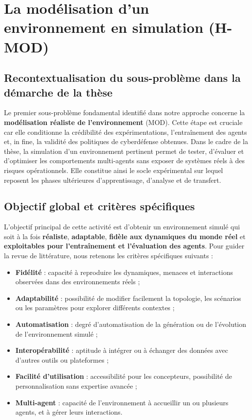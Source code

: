 \section{La modélisation d'un environnement en simulation (H-MOD)}

\subsection*{Recontextualisation du sous-problème dans la démarche de la thèse}

Le premier sous-problème fondamental identifié dans notre approche concerne la \textbf{modélisation réaliste de l’environnement} (MOD). Cette étape est cruciale car elle conditionne la crédibilité des expérimentations, l’entraînement des agents et, in fine, la validité des politiques de cyberdéfense obtenues. Dans le cadre de la thèse, la simulation d’un environnement pertinent permet de tester, d’évaluer et d’optimiser les comportements multi-agents sans exposer de systèmes réels à des risques opérationnels. Elle constitue ainsi le socle expérimental sur lequel reposent les phases ultérieures d’apprentissage, d’analyse et de transfert. \subsection*{Objectif global et critères spécifiques} L’objectif principal de cette activité est d’obtenir un environnement simulé qui soit à la fois \textbf{réaliste}, \textbf{adaptable}, \textbf{fidèle aux dynamiques du monde réel} et \textbf{exploitables pour l’entraînement et l’évaluation des agents}. Pour guider la revue de littérature, nous retenons les critères spécifiques suivants :
%
\begin{itemize}
  \item \textbf{Fidélité} : capacité à reproduire les dynamiques, menaces et interactions observées dans des environnements réels ;
  \item \textbf{Adaptabilité} : possibilité de modifier facilement la topologie, les scénarios ou les paramètres pour explorer différents contextes ;
  \item \textbf{Automatisation} : degré d’automatisation de la génération ou de l’évolution de l’environnement simulé ;
  \item \textbf{Interopérabilité} : aptitude à intégrer ou à échanger des données avec d’autres outils ou plateformes ;
  \item \textbf{Facilité d’utilisation} : accessibilité pour les concepteurs, possibilité de personnalisation sans expertise avancée ;
  \item \textbf{Multi-agent} : capacité de l’environnement à accueillir un ou plusieurs agents, et à gérer leurs interactions.
\end{itemize}

